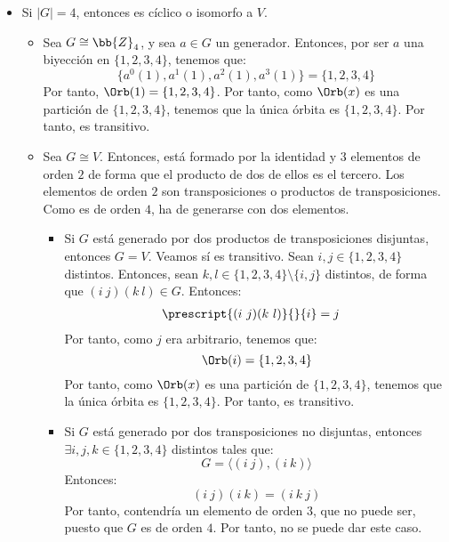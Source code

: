 \begin{ejercicio}
\begin{enumerate}
\begin{itemize}
            \item Si $|G|=4$, entonces es cíclico o isomorfo a $V$.
            \begin{itemize}
                \item Sea $G\cong \bb{Z}_4$, y sea $a\in G$ un generador. Entonces, por ser $a$ una biyección en $\{1, 2, 3, 4\}$, tenemos que:
                \begin{equation*}
                    \{a^0(1), a^1(1), a^2(1), a^3(1)\} = \{1,2,3,4\}
                \end{equation*}
                Por tanto, $\Orb(1)=\{1, 2, 3, 4\}$. Por tanto, como $\Orb(x)$ es una partición de $\{1, 2, 3, 4\}$, tenemos que la única órbita es $\{1, 2, 3, 4\}$. Por tanto, es transitivo.

                \item Sea $G\cong V$. Entonces, está formado por la identidad y $3$ elementos de orden $2$ de forma que el producto de dos de ellos es el tercero. Los elementos de orden $2$ son transposiciones o productos de transposiciones. Como es de orden $4$, ha de generarse con dos elementos.
                \begin{itemize}
                    \item Si $G$ está generado por dos productos de transposiciones disjuntas, entonces $G=V$. Veamos sí es transitivo. Sean $i,j\in \{1, 2, 3, 4\}$ distintos. Entonces, sean $k,l\in \{1, 2, 3, 4\}\setminus \{i,j\}$ distintos, de forma que $(i\ j)(k\ l)\in G$. Entonces:
                    \begin{align*}
                        \prescript{(i\ j)(k\ l)}{}{i} &= j
                    \end{align*}
                    Por tanto, como $j$ era arbitrario, tenemos que:
                    \begin{equation*}
                        \Orb(i) = \{1, 2, 3, 4\}
                    \end{equation*}
                    Por tanto, como $\Orb(x)$ es una partición de $\{1, 2, 3, 4\}$, tenemos que la única órbita es $\{1, 2, 3, 4\}$. Por tanto, es transitivo.

                    \item Si $G$ está generado por dos transposiciones no disjuntas, entonces $\exists i,j,k\in \{1, 2, 3, 4\}$ distintos tales que:
                    \begin{equation*}
                        G = \langle (i\ j), (i\ k) \rangle
                    \end{equation*}
                    Entonces:
                    \begin{equation*}
                        (i\ j)(i\ k) = (i\ k\ j)
                    \end{equation*}
                    Por tanto, contendría un elemento de orden $3$, que no puede ser, puesto que $G$ es de orden $4$. Por tanto, no se puede dar este caso.


\end{itemize}
\end{itemize}
\end{itemize}
\end{enumerate}
\end{ejercicio}
